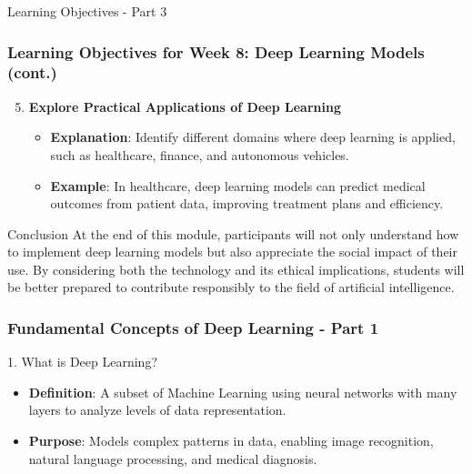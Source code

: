 \documentclass[aspectratio=169]{beamer}
\begin{document}
\begin{frame}[fragile]{Learning Objectives - Part 3}
    \frametitle{Learning Objectives for Week 8: Deep Learning Models (cont.)}

    \begin{enumerate}
        \setcounter{enumi}{4} %
        \item \textbf{Explore Practical Applications of Deep Learning}
        \begin{itemize}
            \item \textbf{Explanation}: Identify different domains where deep learning is applied, such as healthcare, finance, and autonomous vehicles.
            \item \textbf{Example}: In healthcare, deep learning models can predict medical outcomes from patient data, improving treatment plans and efficiency.
        \end{itemize}
    \end{enumerate}

    \begin{block}{Conclusion}
        At the end of this module, participants will not only understand how to implement deep learning models but also appreciate the social impact of their use. By considering both the technology and its ethical implications, students will be better prepared to contribute responsibly to the field of artificial intelligence.
    \end{block}
\end{frame}

\begin{frame}[fragile]
    \frametitle{Fundamental Concepts of Deep Learning - Part 1}
    \begin{block}{1. What is Deep Learning?}
        \begin{itemize}
            \item \textbf{Definition}: A subset of Machine Learning using neural networks with many layers to analyze levels of data representation.
            \item \textbf{Purpose}: Models complex patterns in data, enabling image recognition, natural language processing, and medical diagnosis.
        \end{itemize}
    \end{block}
\end{frame}
\end{document}
